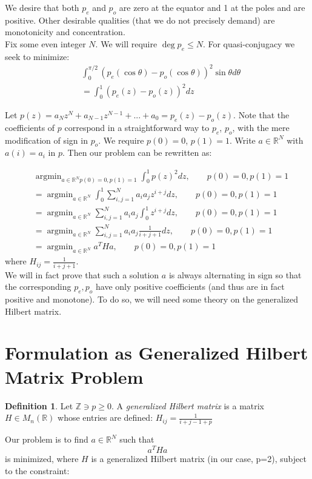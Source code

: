 \documentclass[11pt]{article}
\theoremstyle{definition}
\newtheorem{defn}[thm]{Definition}
\theoremstyle{remark}
\numberwithin{equation}{section}
\DeclareMathOperator{\argmin}{argmin}
\begin{document}
We desire that both $p_e$ and $p_o$ are zero at the equator and 1 at the poles and are positive. Other desirable qualities (that we do not precisely demand) are monotonicity and concentration.\\

Fix some even integer $N$. We will require $\deg p_e \le N$. For quasi-conjugacy we seek to minimize: 
\begin{align}
&\int_0^{\pi/2} (p_e(\cos\theta) - p_o(\cos\theta))^2 \sin\theta d\theta\\ \label{quasiconjugacy-poly-formulation}
&= \int_0^1 (p_e(z) - p_o(z))^2 dz
\end{align}

Let $p(z) = a_Nz^N + a_{N-1}z^{N-1} + ... + a_0 = p_e(z) - p_o(z)$. Note that the coefficients of $p$ correspond in a straightforward way to $p_e$, $p_o$, with the mere modification of sign in $p_o$. We require $p(0) = 0$, $p(1) = 1$. Write $a\in \mathbb{R}^N$ with $a(i) = a_i$ in $p$. Then our problem can be rewritten as: 

\begin{align*}
& \argmin_{a\in\mathbb{R}^N p(0)=0,p(1)=1} \int_0^1 p(z)^2 dz, \qquad p(0)=0, p(1)=1 \\
&=\argmin_{a\in\mathbb{R}^N} \int_0^1 \sum_{i,j=1}^N a_ia_j z^{i+j} dz, \qquad p(0)=0, p(1)=1\\
&= \argmin_{a\in\mathbb{R}^N} \sum_{i,j=1}^N a_ia_j \int_0^1 z^{i+j} dz, \qquad p(0)=0, p(1)=1\\
&= \argmin_{a\in\mathbb{R}^N} \sum_{i,j=1}^N a_ia_j \frac{1}{i+j+1} dz, \qquad p(0)=0, p(1)=1\\
&= \argmin_{a\in\mathbb{R}^N} a^T H a, \qquad p(0)=0, p(1)=1
\end{align*} where $H_{ij} = \frac{1}{i+j+1}$. \\

We will in fact prove that such a solution $a$ is always alternating in sign so that the corresponding $p_e, p_o$ have only positive coefficients (and thus are in fact positive and monotone). To do so, we will need some theory on the generalized Hilbert matrix. 

\section{Formulation as Generalized Hilbert Matrix Problem}\label{formulation-hilbert}
\begin{defn} 
Let $\mathbb{Z} \ni p \ge 0$. A \emph{generalized Hilbert matrix} is a matrix $H\in M_n(\mathbb{R})$ whose entries are defined: 
$H_{ij} = \frac{1}{i+j-1+p}$
\end{defn}
Our problem is to find $a\in\mathbb{R}^N$ such that 
\begin{equation}
a^T H a\end{equation}
is minimized, where $H$ is a generalized Hilbert matrix (in our case, p=2), subject to the constraint: 
\end{document}
